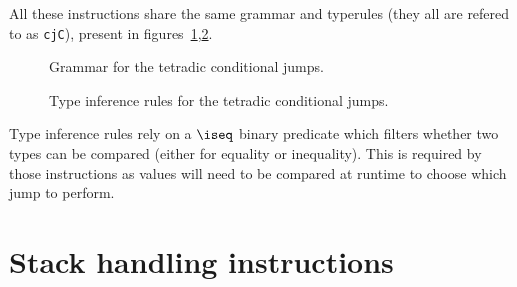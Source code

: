 All these instructions share the same grammar and typerules (they all are refered to as \texttt{cjC}), present in figures~\ref{fig:nstar-instructionset-terminal-cjX-tetradic-grammar},\ref{fig:nstar-instructionset-terminal-cjX-tetradic-typerules}.

\begin{figure}[H]
	\centering


	\caption{Grammar for the tetradic conditional jumps.}
	\label{fig:nstar-instructionset-terminal-cjX-tetradic-grammar}
\end{figure}

\begin{figure}[H]
	\centering


	\caption{Type inference rules for the tetradic conditional jumps.}
	\label{fig:nstar-instructionset-terminal-cjX-tetradic-typerules}
\end{figure}

Type inference rules rely on a $\iseq$ binary predicate which filters whether two types can be compared (either for equality or inequality).
This is required by those instructions as values will need to be compared at runtime to choose which jump to perform.

\section{Stack handling instructions}\label{sec:nstar-instructionset-stack}

